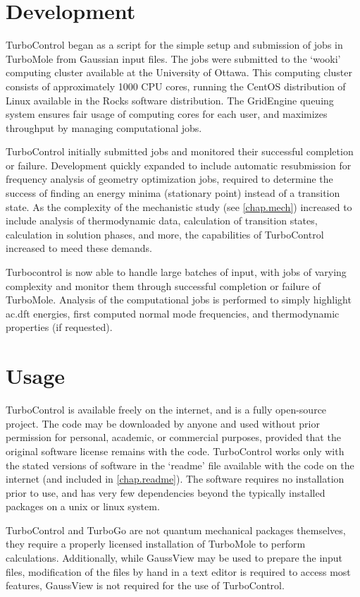 \section{Development}

TurboControl began as a script for the simple setup and submission of jobs in TurboMole from Gaussian input files. The jobs were submitted to the `wooki' computing cluster available at the University of Ottawa. This computing cluster consists of approximately 1000 CPU cores, running the CentOS distribution of Linux available in the Rocks software distribution. The GridEngine queuing system ensures fair usage of computing cores for each user, and maximizes throughput by managing computational jobs. 

TurboControl initially submitted jobs and monitored their successful completion or failure. Development quickly expanded to include automatic resubmission for frequency analysis of geometry optimization jobs, required to determine the success of finding an energy minima (stationary point) instead of a transition state. As the complexity of the mechanistic study (see \autoref{chap.mech}) increased to include analysis of thermodynamic data, calculation of transition states, calculation in solution phases, and more, the capabilities of TurboControl increased to meed these demands. 

Turbocontrol is now able to handle large batches of input, with jobs of varying complexity and monitor them through successful completion or failure of TurboMole. Analysis of the computational jobs is performed to simply highlight \gls{ac.dft} energies, first computed normal mode frequencies, and thermodynamic properties (if requested). 

\section{Usage}

TurboControl is available freely on the internet, and is a fully open-source project\autocite{bulsink2014}. The code may be downloaded by anyone and used without prior permission for personal, academic, or commercial purposes, provided that the original software license remains with the code. TurboControl works only with the stated versions of software in the `readme' file available with the code on the internet (and included in \autoref{chap.readme}). The software requires no installation prior to use, and has very few dependencies beyond the typically installed packages on a unix or linux system. 

TurboControl and TurboGo are not quantum mechanical packages themselves, they require a properly licensed installation of TurboMole to perform calculations. Additionally, while GaussView may be used to prepare the input files, modification of the files by hand in a text editor is required to access most features, GaussView is not required for the use of TurboControl. 



